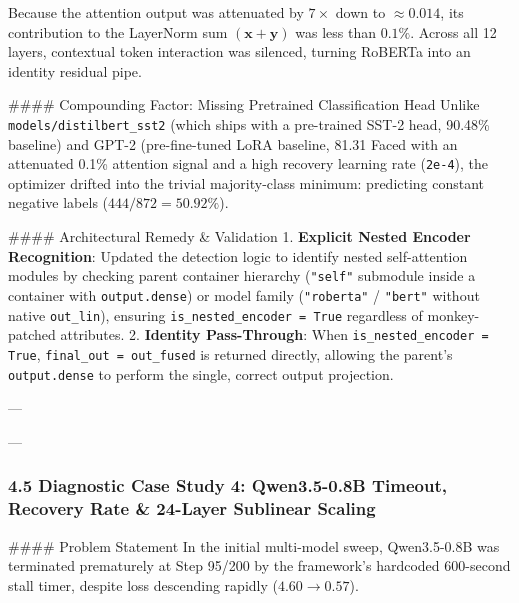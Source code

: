 {{{{Because the attention output was attenuated by $7\times$ down to $\approx 0.014$, its contribution to the LayerNorm sum $(\mathbf{x} + \mathbf{y})$ was less than $0.1\%$. Across all 12 layers, contextual token interaction was silenced, turning RoBERTa into an identity residual pipe.

#### Compounding Factor: Missing Pretrained Classification Head
Unlike \texttt{models/distilbert_sst2} (which ships with a pre-trained SST-2 head, 90.48\% baseline) and GPT-2 (pre-fine-tuned LoRA baseline, 81.31%
Faced with an attenuated 0.1\% attention signal and a high recovery learning rate (\texttt{2e-4}), the optimizer drifted into the trivial majority-class minimum: predicting constant negative labels ($444/872 = \mathbf{50.92\%}$).

#### Architectural Remedy \& Validation
1. \textbf{Explicit Nested Encoder Recognition}: Updated the detection logic to identify nested self-attention modules by checking parent container hierarchy (\texttt{"self"} submodule inside a container with \texttt{output.dense}) or model family (\texttt{"roberta"} / \texttt{"bert"} without native \texttt{out_lin}), ensuring \texttt{is_nested_encoder = True} regardless of monkey-patched attributes.
2. \textbf{Identity Pass-Through}: When \texttt{is_nested_encoder = True}, \texttt{final_out = out_fused} is returned directly, allowing the parent's \texttt{output.dense} to perform the single, correct output projection.

---

---

\subsubsection{4.5 Diagnostic Case Study 4: Qwen3.5-0.8B Timeout, Recovery Rate & 24-Layer Sublinear Scaling}

#### Problem Statement
In the initial multi-model sweep, Qwen3.5-0.8B was terminated prematurely at Step 95/200 by the framework's hardcoded 600-second stall timer, despite loss descending rapidly ($4.60 \to 0.57$).

}}}}
